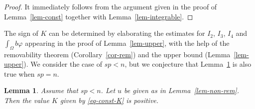 \documentclass[11pt]{amsart}
\theoremstyle{plain}
\newtheorem{lemma}[theorem]{Lemma}
\theoremstyle{definition}
\numberwithin{equation}{section}
\begin{document}
\begin{proof}
    It immediately follows from the argument given in the proof of Lemma~\ref{lem-const} together with Lemma~\ref{lem-integrable}.
\end{proof}

The sign of $K$ can be determined by elaborating the estimates for $I_2$, $I_3$, $I_4$ and $\int_{\Omega}b \varphi$ appearing in the proof of Lemma~\ref{lem-upper}, with the help of the removability theorem (Corollary~\ref{cor-rem}) and the upper bound (Lemma~\ref{lem-upper}). We consider the case of $sp<n$, but we conjecture that Lemma~\ref{lem-positive-K} is also true when $sp=n$.
 

\begin{lemma}\label{lem-positive-K}
Assume that $sp<n$. Let $u$ be given as in Lemma~\ref{lem-non-rem}. Then the value $K$ given by \eqref{eq-const-K} is positive.
\end{lemma}
\end{document}

